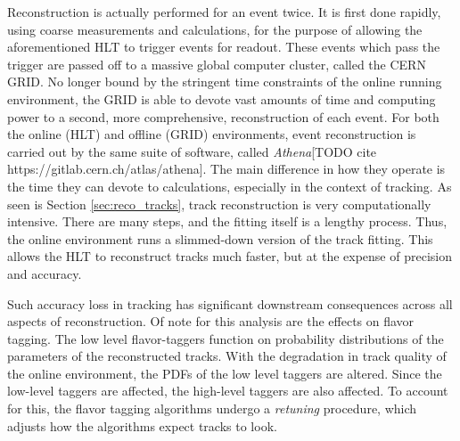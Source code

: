         Reconstruction is actually performed for an event twice.
        It is first done rapidly, using coarse measurements and calculations,
            for the purpose of allowing the aforementioned HLT to trigger events for readout.
        These events which pass the trigger are passed off to a massive global computer cluster, called the CERN GRID.
        No longer bound by the stringent time constraints of the online running environment,
            the GRID is able to devote vast amounts of time and computing power to a second, 
            more comprehensive, reconstruction of each event.
        For both the online (HLT) and offline (GRID) environments, event reconstruction is carried out by the same suite of software,
            called \textit{Athena}[TODO cite https://gitlab.cern.ch/atlas/athena].
        The main difference in how they operate is the time they can devote to calculations, especially in the context of tracking.
        As seen is Section \ref{sec:reco_tracks}, track reconstruction is very computationally intensive.
        There are many steps, and the fitting itself is a lengthy process.
        Thus, the online environment runs a slimmed-down version of the track fitting.
        This allows the HLT to reconstruct tracks much faster, but at the expense of precision and accuracy.

        Such accuracy loss in tracking has significant downstream consequences across all aspects of reconstruction.
        Of note for this analysis are the effects on flavor tagging.
        The low level flavor-taggers function on probability distributions of the parameters of the reconstructed tracks.
        With the degradation in track quality of the online environment, the PDFs of the low level taggers are altered.
        Since the low-level taggers are affected, the high-level taggers are also affected.
        To account for this, the flavor tagging algorithms undergo a \textit{retuning} procedure, 
            which adjusts how the algorithms expect tracks to look.

